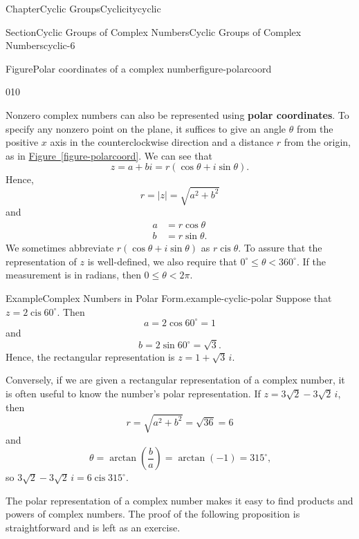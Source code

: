 \documentclass[oneside,10pt,]{book}
\newcommand{\xreffont}{\relax}
\newcommand{\terminology}[1]{\textbf{#1}}
\numberwithin{equation}{section}
\newcommand{\cis}{\operatorname{cis}}
\newcommand{\lt}{<}
\begin{document}
\begin{chapterptx}{Chapter}{Cyclic Groups}{}{Cyclicity}{}{}{cyclic}
\begin{sectionptx}{Section}{Cyclic Groups of Complex Numbers}{}{Cyclic Groups of Complex Numbers}{}{}{cyclic-6}
\begin{figureptx}{Figure}{Polar coordinates of a complex number}{figure-polarcoord}{}
\begin{image}{0}{1}{0}{}
{\begin{tikzpicture}[scale=0.5]
\end{tikzpicture}%
}%
\end{image}%
\tcblower
\end{figureptx}%
Nonzero complex numbers can also be represented using \terminology{polar coordinates}.  To specify  any nonzero point on the plane, it suffices to give an angle \(\theta\) from the positive \(x\) axis in the counterclockwise direction and a distance \(r\) from the origin, as in \hyperref[figure-polarcoord]{Figure~{\xreffont\ref{figure-polarcoord}}}. We can see that%
\begin{equation*}
z = a + bi = r( \cos \theta + i \sin \theta)\text{.}
\end{equation*}
Hence,%
\begin{equation*}
r = |z| = \sqrt{a^2 + b^2}
\end{equation*}
and%
\begin{align*}
a & = r \cos \theta\\
b & = r \sin \theta\text{.}
\end{align*}
We sometimes abbreviate \(r( \cos \theta + i \sin \theta)\) as \(r \cis \theta\).  To assure that the representation of \(z\) is  well-defined, we also require that \(0^{\circ} \leq \theta \lt 360^{\circ}\).  If the measurement is in radians, then \(0 \leq \theta \lt2 \pi\).\label{cyclic-6-9-14}%
\begin{example}{Example}{Complex Numbers in Polar Form.}{example-cyclic-polar}%
Suppose that \(z = 2 \cis  60^{\circ}\). Then%
\begin{equation*}
a = 2 \cos 60^{\circ} = 1
\end{equation*}
and%
\begin{equation*}
b = 2 \sin 60^{\circ} = \sqrt{3}\text{.}
\end{equation*}
Hence, the rectangular representation is \(z = 1+\sqrt{3}\, i\).%
\par
Conversely, if we are given a rectangular representation of a complex number, it is often useful to know the number's polar representation. If \(z = 3 \sqrt{2} - 3 \sqrt{2}\, i\), then%
\begin{equation*}
r = \sqrt{a^2 + b^2} = \sqrt{36 } = 6
\end{equation*}
and%
\begin{equation*}
\theta = \arctan \left( \frac{b}{a} \right) = \arctan( - 1) = 315^{\circ}\text{,}
\end{equation*}
so \(3 \sqrt{2} - 3 \sqrt{2}\, i=6 \cis  315^{\circ}\).%
\end{example}
The polar representation of a complex number makes it easy to find products and powers of complex numbers.  The proof of the following proposition is straightforward and is left as an exercise.%

\end{sectionptx}
\end{chapterptx}
\end{document}
